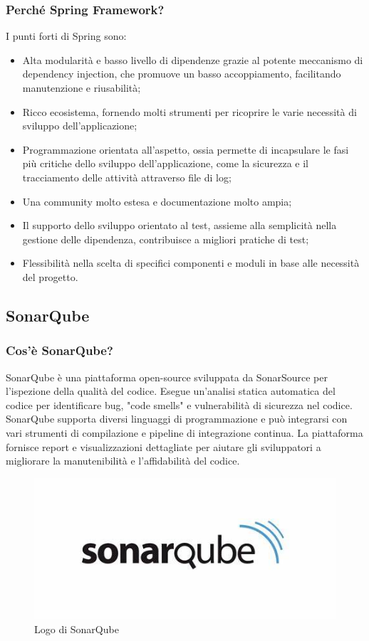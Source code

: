             \subsubsection{Perché Spring Framework? \cite{Spoclearn1}}
                I punti forti di Spring sono:
                \begin{itemize}
                    \item Alta modularità e basso livello di dipendenze grazie al potente meccanismo di dependency injection, che promuove un basso accoppiamento, facilitando manutenzione e riusabilità;
                    \item  Ricco ecosistema, fornendo molti strumenti per ricoprire le varie necessità di sviluppo dell'applicazione;
                    \item Programmazione orientata all'aspetto, ossia permette di incapsulare le fasi più critiche dello sviluppo dell'applicazione, come la sicurezza e il tracciamento delle attività attraverso file di log;
                    \item Una community molto estesa e documentazione molto ampia;
                    \item Il supporto dello sviluppo orientato al test, assieme alla semplicità nella gestione delle dipendenza, contribuisce a migliori pratiche di test;
                    \item Flessibilità nella scelta di specifici componenti e moduli in base alle necessità del progetto.
                \end{itemize}

    \subsection{SonarQube}
        \subsubsection{Cos'è SonarQube?}
            SonarQube è una piattaforma open-source sviluppata da SonarSource per l'ispezione della qualità del codice. Esegue un'analisi statica automatica del codice per identificare bug, "code smells" e vulnerabilità di sicurezza nel codice. SonarQube supporta diversi linguaggi di programmazione e può integrarsi con vari strumenti di compilazione e pipeline di integrazione continua. La piattaforma fornisce report e visualizzazioni dettagliate per aiutare gli sviluppatori a migliorare la manutenibilità e l'affidabilità del codice.
        \begin{figure}[htbp!]
                \centering
                \includegraphics[width=0.5\linewidth]{Immagini/System Design/SonarQube.jpg}
                \caption{Logo di SonarQube}
        \end{figure}
